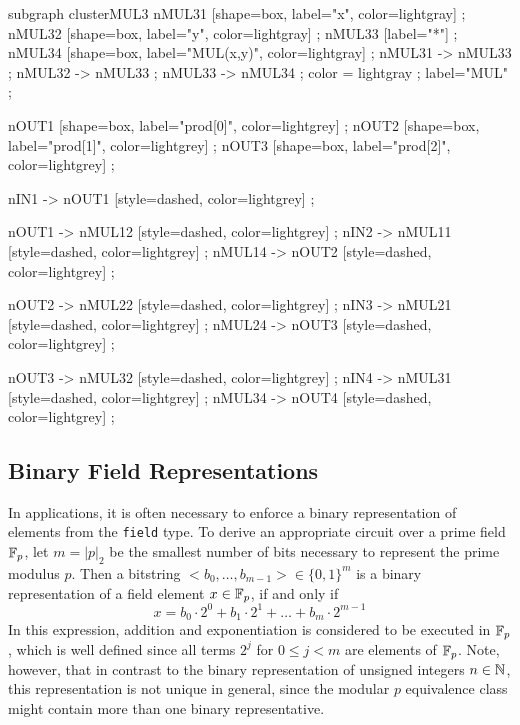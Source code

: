\begin{example}
\begin{center}
{    subgraph clusterMUL3 {
    nMUL31 [shape=box, label="x", color=lightgray] ;
    nMUL32 [shape=box, label="y", color=lightgray] ;
    nMUL33 [label="*"] ;
    nMUL34 [shape=box, label="MUL(x,y)", color=lightgray] ;
    nMUL31 -> nMUL33 ;
    nMUL32 -> nMUL33 ;
    nMUL33 -> nMUL34 ;
    color = lightgray ;
    label="MUL" ;
  }

  nOUT1 [shape=box, label="prod[0]", color=lightgrey] ;
  nOUT2 [shape=box, label="prod[1]", color=lightgrey] ;
  nOUT3 [shape=box, label="prod[2]", color=lightgrey] ;
  
  nIN1 -> nOUT1 [style=dashed, color=lightgrey] ;
  
  nOUT1 -> nMUL12 [style=dashed, color=lightgrey] ;
  nIN2 -> nMUL11 [style=dashed, color=lightgrey] ;
  nMUL14 -> nOUT2 [style=dashed, color=lightgrey] ;
 
  nOUT2 -> nMUL22 [style=dashed, color=lightgrey] ;
  nIN3 -> nMUL21 [style=dashed, color=lightgrey] ;
  nMUL24 -> nOUT3 [style=dashed, color=lightgrey] ; 
  
  nOUT3 -> nMUL32 [style=dashed, color=lightgrey] ;
  nIN4 -> nMUL31 [style=dashed, color=lightgrey] ;
  nMUL34 -> nOUT4 [style=dashed, color=lightgrey] ;  
  
}
\end{center}
\end{example}
\subsection{Binary Field Representations} In applications, it is often necessary to enforce a binary representation of elements from the \texttt{field} type. To derive an appropriate circuit over a prime field $\mathbb{F}_p$, let $m=|p|_2$ be the smallest number of bits necessary to represent the prime modulus $p$. Then a bitstring $<b_0,\ldots,b_{m-1}>\in \{0,1\}^m$ is a binary representation of a field element $x\in\mathbb{F}_p$, if and only if
\begin{equation}
\label{def:binary_field_rep}
x = b_0\cdot 2^0 + b_1\cdot 2^1 + \ldots + b_m\cdot 2^{m-1}
\end{equation}
In this expression, addition and exponentiation is considered to be executed in $\mathbb{F}_p$, which is well defined since all terms $2^j$ for $0\leq j < m$ are elements of $\mathbb{F}_p$. Note, however, that in contrast to the binary representation of unsigned integers $n\in\mathbb{N}$, this representation is not unique in general, since the modular $p$ equivalence class might contain more than one binary representative. 

